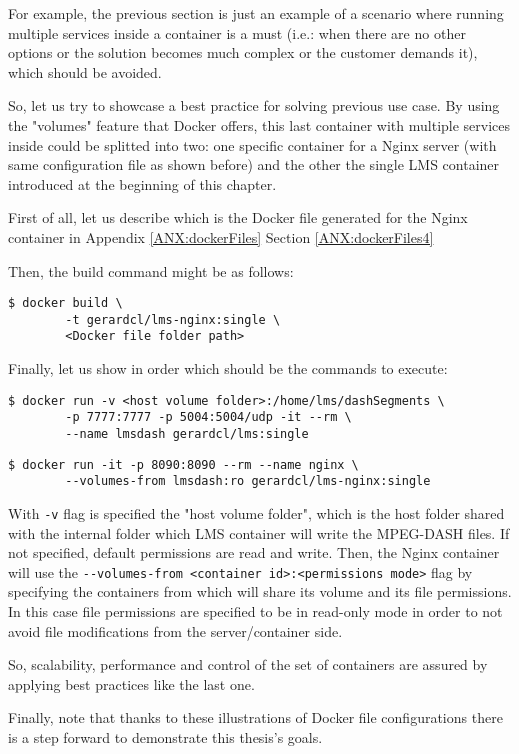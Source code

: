 For example, the previous section is just an example of a scenario where running multiple services inside a container is a must (i.e.: when there are no other options or the solution becomes much complex or the customer demands it), which should be avoided.

So, let us try to showcase a best practice for solving previous use case. By using the "volumes" feature that Docker offers, this last container with multiple services inside could be splitted into two: one specific container for a Nginx server (with same configuration file as shown before) and the other the single LMS container introduced at the beginning of this chapter. 

First of all, let us describe which is the Docker file generated for the Nginx container in Appendix
\ref{ANX:dockerFiles} Section \ref{ANX:dockerFiles4}

Then, the build command might be as follows:

\begin{verbatim}
$ docker build \
		-t gerardcl/lms-nginx:single \
		<Docker file folder path>
\end{verbatim}

Finally, let us show in order which should be the commands to execute:

\begin{verbatim}
$ docker run -v <host volume folder>:/home/lms/dashSegments \
		-p 7777:7777 -p 5004:5004/udp -it --rm \
		--name lmsdash gerardcl/lms:single
\end{verbatim}

\begin{verbatim}
$ docker run -it -p 8090:8090 --rm --name nginx \
		--volumes-from lmsdash:ro gerardcl/lms-nginx:single 
\end{verbatim}

With \verb|-v| flag is specified the "host volume folder", which is the host folder shared with the internal folder which LMS container will write the MPEG-DASH files. If not specified, default permissions are read and write. Then, the Nginx container will use the \verb|--volumes-from <container id>:<permissions mode>| flag by specifying the containers from which will share its volume and its file permissions. In this case file permissions are specified to be in read-only mode in order to not avoid file modifications from the server/container side.  
 
So, scalability, performance and control of the set of containers are assured by applying best practices like the last one.

Finally, note that thanks to these illustrations of Docker file configurations there is a step forward to demonstrate this thesis's goals.
